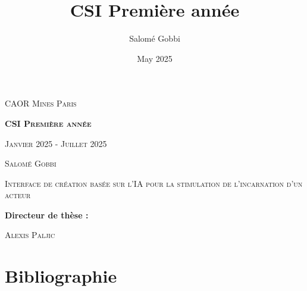 \documentclass[12pt,a4paper]{article}
\title{CSI Première année}
\author{Salomé Gobbi}
\date{May 2025}
\begin{document}
\begin{titlepage}
    \begin{center}
        \vspace*{1cm}
        
        \large{\textsc{CAOR Mines Paris}}
        
        \vspace{0.5cm}
        \textbf{\Huge{\textsc{CSI Première année}}}
        
        \vspace{0.5cm}
        \textsc{Janvier 2025 - Juillet 2025}
        
        \vspace{1cm}
        
        \Large{\textsc{Salomé Gobbi}}

        \vspace{0.5cm}
        \large{\textsc{Interface de création basée sur l'IA pour la stimulation de l'incarnation d'un acteur}}
        
        
        
        \vspace{0.8cm}
        
        \begin{multicols}{2}
        \raggedleft
        \textbf{\large{Directeur de thèse :}}\\
        \raggedright
        \textsc{Alexis Paljic}\\
        \end{multicols}
        
    \end{center}
\end{titlepage}

\renewcommand{\contentsname}{Sommaire}
\tableofcontents
\newpage

\pagestyle{fancy}
\renewcommand\headrulewidth{1pt}
\fancyhead[R]{}

\newpage


\newpage


\newpage


\newpage



\newpage
\section{Bibliographie}
\printbibliography
\end{document}
